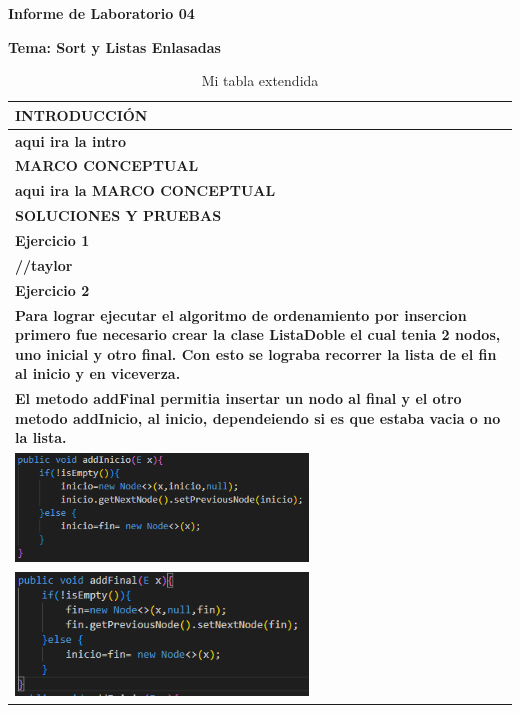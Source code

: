 \documentclass{article}
\newcommand{\itemPracticeNumber}{04}
\newcommand{\itemTheme}{Sort y Listas Enlasadas}
\begin{document}
	
	\vspace*{10px}
	
	\begin{center}	
		\fontsize{17}{17} \textbf{ Informe de Laboratorio \itemPracticeNumber}
	\end{center}
	\centerline{\textbf{\Large Tema: \itemTheme}}

	\begin{longtable}{|p{15cm}|}
			\caption{Mi tabla extendida}\\
			\hline 
			\rowcolor{tablebackground}
			\color{white}\textbf{INTRODUCCIÓN}  \\
			\hline 
			\textbf{aqui ira la intro}  \\
			\hline 
			\rowcolor{tablebackground}
			\color{white}\textbf{MARCO CONCEPTUAL}  \\
			\hline 
			\textbf{aqui ira la MARCO CONCEPTUAL}  \\
			\hline 
			\rowcolor{tablebackground}
			\color{white}\textbf{SOLUCIONES Y PRUEBAS}  \\
			\hline 
			\textbf{Ejercicio 1}  \\
			\textbf{//taylor}  \\
			\textbf{Ejercicio 2}  \\
			\textbf{Para lograr ejecutar el algoritmo de ordenamiento por insercion 
			primero fue necesario crear la clase ListaDoble el cual tenia 2 nodos,
			uno inicial y otro final. Con esto se lograba recorrer la lista de el
			fin al inicio y en viceverza.}  \\
			\textbf{El metodo addFinal permitia insertar un nodo al final y el otro
			metodo addInicio, al inicio, dependeiendo si es que estaba vacia o no la lista.}  \\
			\includegraphics[width=0.6\textwidth,keepaspectratio]{img/addInicio.png}\\
			\includegraphics[width=0.6\textwidth,keepaspectratio]{img/addFinal.png}\\

\end{longtable}
\end{document}
